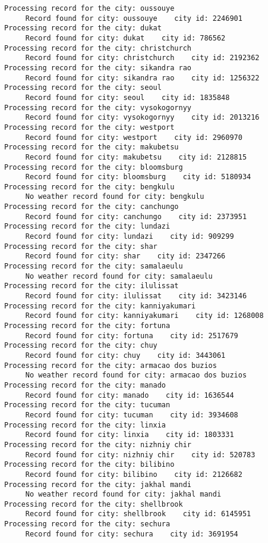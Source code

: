 \documentclass[11pt]{article}
\begin{document}
\begin{Verbatim}[commandchars=\\\{\}]
Processing record for the city: oussouye
     Record found for city: oussouye    city id: 2246901
Processing record for the city: dukat
     Record found for city: dukat    city id: 786562
Processing record for the city: christchurch
     Record found for city: christchurch    city id: 2192362
Processing record for the city: sikandra rao
     Record found for city: sikandra rao    city id: 1256322
Processing record for the city: seoul
     Record found for city: seoul    city id: 1835848
Processing record for the city: vysokogornyy
     Record found for city: vysokogornyy    city id: 2013216
Processing record for the city: westport
     Record found for city: westport    city id: 2960970
Processing record for the city: makubetsu
     Record found for city: makubetsu    city id: 2128815
Processing record for the city: bloomsburg
     Record found for city: bloomsburg    city id: 5180934
Processing record for the city: bengkulu
     No weather record found for city: bengkulu
Processing record for the city: canchungo
     Record found for city: canchungo    city id: 2373951
Processing record for the city: lundazi
     Record found for city: lundazi    city id: 909299
Processing record for the city: shar
     Record found for city: shar    city id: 2347266
Processing record for the city: samalaeulu
     No weather record found for city: samalaeulu
Processing record for the city: ilulissat
     Record found for city: ilulissat    city id: 3423146
Processing record for the city: kanniyakumari
     Record found for city: kanniyakumari    city id: 1268008
Processing record for the city: fortuna
     Record found for city: fortuna    city id: 2517679
Processing record for the city: chuy
     Record found for city: chuy    city id: 3443061
Processing record for the city: armacao dos buzios
     No weather record found for city: armacao dos buzios
Processing record for the city: manado
     Record found for city: manado    city id: 1636544
Processing record for the city: tucuman
     Record found for city: tucuman    city id: 3934608
Processing record for the city: linxia
     Record found for city: linxia    city id: 1803331
Processing record for the city: nizhniy chir
     Record found for city: nizhniy chir    city id: 520783
Processing record for the city: bilibino
     Record found for city: bilibino    city id: 2126682
Processing record for the city: jakhal mandi
     No weather record found for city: jakhal mandi
Processing record for the city: shellbrook
     Record found for city: shellbrook    city id: 6145951
Processing record for the city: sechura
     Record found for city: sechura    city id: 3691954

\end{Verbatim}
\end{document}

